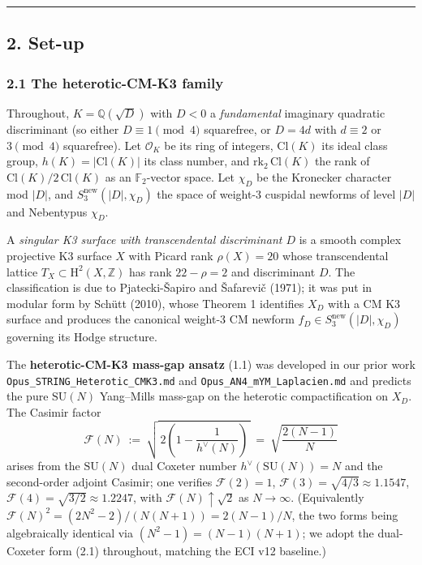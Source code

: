\documentclass[
  11pt,
  a4paper,
]{amsart}
\begin{document}
\begin{center}\rule{0.5\linewidth}{0.5pt}\end{center}

\hypertarget{set-up}{%
\subsection{2. Set-up}\label{set-up}}

\hypertarget{the-heterotic-cm-k3-family}{%
\subsubsection{2.1 The heterotic-CM-K3 family}\label{the-heterotic-cm-k3-family}}

Throughout, \(K = \mathbb{Q}(\sqrt{D})\) with \(D < 0\) a \emph{fundamental} imaginary quadratic discriminant (so either \(D \equiv 1 \pmod 4\) squarefree, or \(D = 4d\) with \(d \equiv 2\) or \(3 \pmod 4\) squarefree). Let \(\mathcal{O}_K\) be its ring of integers, \(\mathrm{Cl}(K)\) its ideal class group, \(h(K) = |\mathrm{Cl}(K)|\) its class number, and \(\mathrm{rk}_2\, \mathrm{Cl}(K)\) the rank of \(\mathrm{Cl}(K)/2\,\mathrm{Cl}(K)\) as an \(\mathbb{F}_2\)-vector space. Let \(\chi_D\) be the Kronecker character mod \(|D|\), and \(S_3^{\mathrm{new}}(|D|, \chi_D)\) the space of weight-3 cuspidal newforms of level \(|D|\) and Nebentypus \(\chi_D\).

A \emph{singular K3 surface with transcendental discriminant \(D\)} is a smooth complex projective K3 surface \(X\) with Picard rank \(\rho(X) = 20\) whose transcendental lattice \(T_X \subset \mathrm{H}^2(X, \mathbb{Z})\) has rank \(22 - \rho = 2\) and discriminant \(D\). The classification is due to Pjatecki-Šapiro and Šafarevič (1971); it was put in modular form by Schütt (2010), whose Theorem 1 identifies \(X_D\) with a CM K3 surface and produces the canonical weight-3 CM newform \(f_D \in S_3^{\mathrm{new}}(|D|, \chi_D)\) governing its Hodge structure.

The \textbf{heterotic-CM-K3 mass-gap ansatz} (1.1) was developed in our prior work \texttt{Opus\_STRING\_Heterotic\_CMK3.md} and \texttt{Opus\_AN4\_mYM\_Laplacien.md} and predicts the pure \(\mathrm{SU}(N)\) Yang--Mills mass-gap on the heterotic compactification on \(X_D\). The Casimir factor
\[
\mathcal{F}(N)\ :=\ \sqrt{\,2\!\left(1 - \frac{1}{h^{\!\vee}(N)}\right)\,} \ =\ \sqrt{\frac{2(N-1)}{N}}
\tag{2.1}
\]
arises from the \(\mathrm{SU}(N)\) dual Coxeter number \(h^{\!\vee}(\mathrm{SU}(N)) = N\) and the second-order adjoint Casimir; one verifies \(\mathcal{F}(2) = 1\), \(\mathcal{F}(3) = \sqrt{4/3} \approx 1.1547\), \(\mathcal{F}(4) = \sqrt{3/2} \approx 1.2247\), with \(\mathcal{F}(N) \uparrow \sqrt{2}\) as \(N \to \infty\). (Equivalently \(\mathcal{F}(N)^2 = (2N^2 - 2)/(N(N+1)) = 2(N-1)/N\), the two forms being algebraically identical via \((N^2-1) = (N-1)(N+1)\); we adopt the dual-Coxeter form (2.1) throughout, matching the ECI v12 baseline.)
\end{document}

